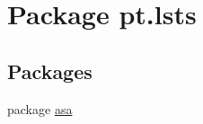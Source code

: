\hypertarget{namespacept_1_1lsts}{}\section{Package pt.\+lsts}
\label{namespacept_1_1lsts}
\subsection*{Packages}
\begin{DoxyCompactItemize}
\item 
package \hyperlink{namespacept_1_1lsts_1_1asa}{asa}
\end{DoxyCompactItemize}
